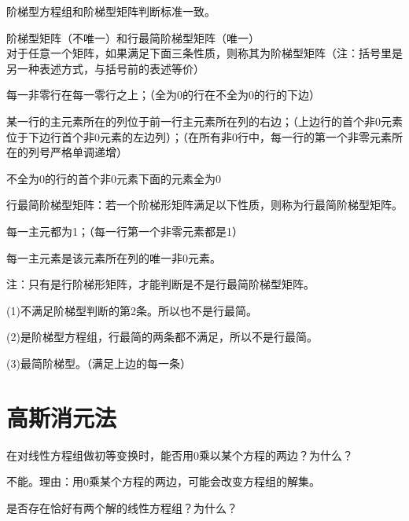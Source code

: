 \documentclass[a4paper]{report}
\begin{document}
\begin{tips}
阶梯型方程组和阶梯型矩阵判断标准一致。

阶梯型矩阵（不唯一）和行最简阶梯型矩阵（唯一）\\
对于任意一个矩阵，如果满足下面三条性质，则称其为\textcolor[rgb]{1.00,0.00,0.00}{阶梯型矩阵}（注：括号里是另一种表述方式，与括号前的表述等价）
\begin{asparaenum}[(1)]
\item 每一非零行在每一零行之上；（全为0的行在不全为0的行的下边）
\item 某一行的主元素所在的列位于前一行主元素所在列的右边；（上边行的首个非0元素位于下边行首个非0元素的左边列）；（在所有非0行中，每一行的第一个非零元素所在的列号严格单调递增）
\item 不全为0的行的首个非0元素下面的元素全为0
\end{asparaenum}
行最简阶梯型矩阵：若一个阶梯形矩阵满足以下性质，则称为\textcolor[rgb]{1.00,0.00,0.00}{行最简阶梯型矩阵}。
\begin{asparaenum}[(1)]
\item 每一主元都为1；（每一行第一个非零元素都是1）
\item 每一主元素是该元素所在列的唯一非0元素。
\end{asparaenum}
注：只有是行阶梯形矩阵，才能判断是不是行最简阶梯型矩阵。
\end{tips}

\begin{jie}
(1)不满足阶梯型判断的第2条。所以也不是行最简。

(2)是阶梯型方程组，行最简的两条都不满足，所以不是行最简。

(3)最简阶梯型。（满足上边的每一条）
\end{jie}

\clearpage
\section{高斯消元法}
\EX 在对线性方程组做初等变换时，能否用0乘以某个方程的两边？为什么？

\begin{jie}
不能。理由：用0乘某个方程的两边，可能会改变方程组的解集。
\end{jie}

\EX 是否存在恰好有两个解的线性方程组？为什么？
\end{document}

